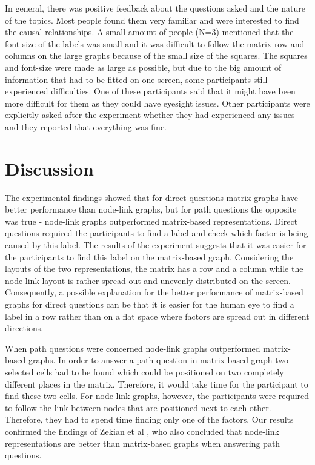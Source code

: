 \documentclass{l4proj}
\begin{document}
In general, there was positive feedback about the questions asked and the nature of the topics. Most people found them very familiar and were interested to find the causal relationships. A small amount of people (N=3) mentioned that the font-size of the labels was small and it was difficult to follow the matrix row and columns on the large graphs because of the small size of the squares. The squares and font-size were made as large as possible, but due to the big amount of information that had to be fitted on one screen, some participants still experienced difficulties. One of these participants said that it might have been more difficult for them as they could have eyesight issues. Other participants were explicitly asked after the experiment whether they had experienced any issues and they reported that everything was fine.

\section{Discussion}

The experimental findings showed that for direct questions matrix graphs have better performance than node-link graphs, but for path questions the opposite was true - node-link graphs outperformed matrix-based representations. Direct questions required the participants to find a label and check which factor is being caused by this label. The results of the experiment suggests that it was easier for the participants to find this label on the matrix-based graph. Considering the layouts of the two representations, the matrix has a row and a column while the node-link layout is rather spread out and unevenly distributed on the screen. Consequently, a possible explanation for the better performance of matrix-based graphs for direct questions can be that it is easier for the human eye to find a label in a row rather than on a flat space where factors are spread out in different directions. 

When path questions were concerned node-link graphs outperformed matrix-based graphs. In order to answer a path question in matrix-based graph two selected cells had to be found which could be positioned on two completely different places in the matrix. Therefore, it would take time for the participant to find these two cells. For node-link graphs, however, the participants were required to follow the link between nodes that are positioned next to each other. Therefore, they had to spend time finding only one of the factors. Our results confirmed the findings of Zekian et al \cite{sheny2007path}, who also concluded that node-link representations are better than matrix-based graphs when answering path questions. 
\end{document}
